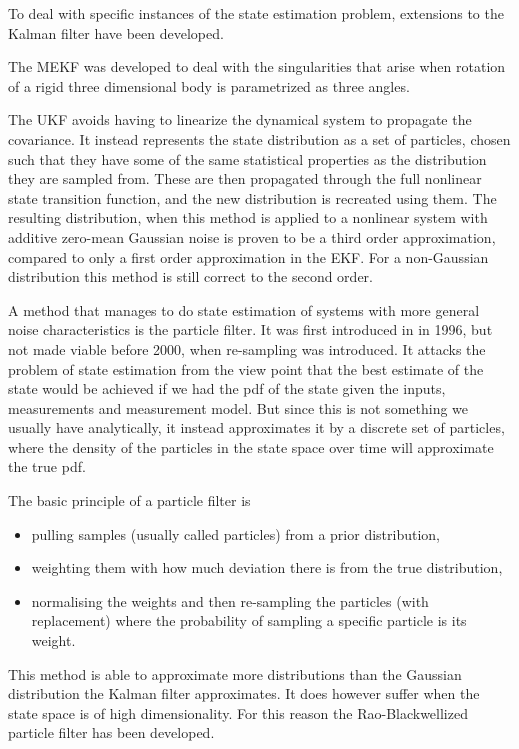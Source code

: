 To deal with specific instances of the state estimation problem, extensions to the Kalman filter have been developed. 

The \gls{MEKF}\cite{MEKF} was developed to deal with the singularities that arise when rotation of a rigid three dimensional body is parametrized as three angles. 

The \gls{UKF}\cite{UKF} avoids having to linearize the dynamical system to propagate the covariance. It instead represents the state distribution as a set of particles, chosen such that they have some of the same statistical properties as the distribution they are sampled from. These are then propagated through the full nonlinear state transition function, and the new distribution is recreated using them. The resulting distribution, when this method is applied to a nonlinear system with additive zero-mean Gaussian noise is proven to be a third order approximation, compared to only a first order approximation in the \gls{EKF}. For a non-Gaussian distribution this method is still correct to the second order.

A method that manages to do state estimation of systems with more general noise characteristics is the particle filter. It was first introduced in \cite{ParticleFilter} in 1996, but not made viable before 2000, when re-sampling was introduced\cite{ParticleResampling}. It attacks the problem of state estimation from the view point that the best estimate of the state would be achieved if we had the \gls{pdf} of the state given the inputs, measurements and measurement model. But since this is not something we usually have analytically, it instead approximates it by a discrete set of particles, where the density of the particles in the state space over time will approximate the true \gls{pdf}. 

The basic principle of a particle filter is 

\begin{itemize}
    \item pulling samples (usually called particles) from a prior distribution, 
    \item weighting them with how much deviation there is from the true distribution, 
    \item normalising the weights and then re-sampling the particles (with replacement) where the probability of sampling a specific particle is its weight. 
\end{itemize}

This method is able to approximate more distributions than the Gaussian distribution the Kalman filter approximates. It does however suffer when the state space is of high dimensionality. For this reason the Rao-Blackwellized particle filter has been developed.

